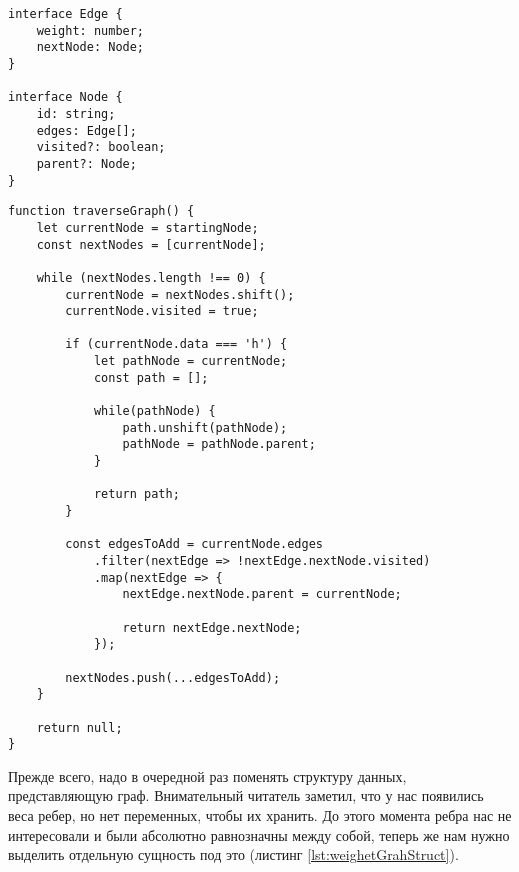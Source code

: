 \documentclass[../article.tex]{subfiles}
\begin{document}
\begin{ruledelement}
        \begin{lstlisting}[caption={Структура для взвешенного графа}, label={lst:weighetGrahStruct}]
interface Edge {
    weight: number;
    nextNode: Node;
}

interface Node {
    id: string;
    edges: Edge[];
    visited?: boolean;
    parent?: Node;
}
    \end{lstlisting}
\end{ruledelement}

\begin{figure*}
    \begin{ruledelement}
        \begin{lstlisting}[caption={Поиск пути при обходе взвешенного графа в ширину}, label={lst:bfsWeightedRandomPath}]
function traverseGraph() {
    let currentNode = startingNode;
    const nextNodes = [currentNode];

    while (nextNodes.length !== 0) {
        currentNode = nextNodes.shift();
        currentNode.visited = true;

        if (currentNode.data === 'h') {
            let pathNode = currentNode;
            const path = [];

            while(pathNode) {
                path.unshift(pathNode);
                pathNode = pathNode.parent;
            }

            return path;
        }

        const edgesToAdd = currentNode.edges
            .filter(nextEdge => !nextEdge.nextNode.visited)
            .map(nextEdge => {
                nextEdge.nextNode.parent = currentNode;

                return nextEdge.nextNode;
            });

        nextNodes.push(...edgesToAdd);
    }

    return null;
}
        \end{lstlisting}
    \end{ruledelement}

\end{figure*}

Прежде всего, надо в очередной раз поменять структуру данных, представляющую граф. Внимательный читатель заметил, что у нас появились веса ребер, но нет переменных, чтобы их хранить. До этого момента ребра нас не интересовали и были абсолютно равнозначны между собой, теперь же нам нужно выделить отдельную сущность под это (листинг \ref{lst:weighetGrahStruct}).
\end{document}
